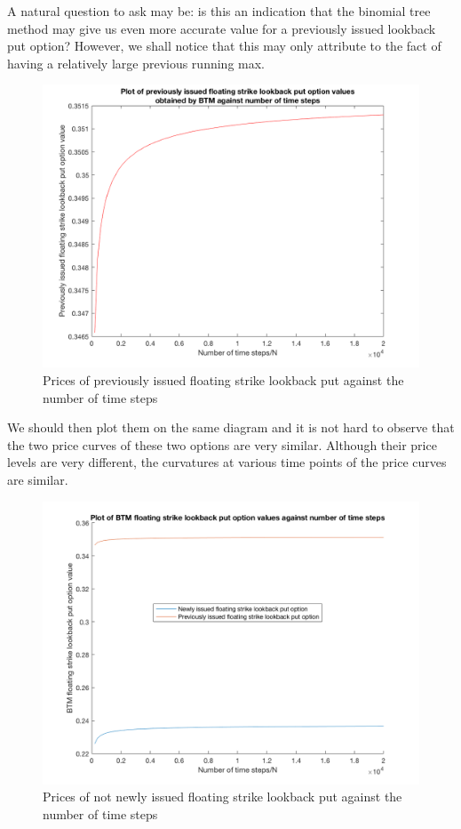 A natural question to ask may be: is this an indication that the binomial tree method may give us even more accurate value for a previously issued lookback put option? However, we shall notice that this may only attribute to the fact of having a relatively large previous running max.\\[4mm]
\begin{figure}[h]
	\centering
	\includegraphics[scale=0.3]{A2_pi.PNG}
	\caption{Prices of previously issued floating strike lookback put against the number of time steps}
\end{figure}
We should then plot them on the same diagram and it is not hard to observe that the two price curves of these two options are very similar. Although their price levels are very different, the curvatures at various time points of the price curves are similar.
\begin{figure}[h]
	\centering
	\includegraphics[scale=0.3]{A2.PNG}
	\caption{Prices of not newly issued floating strike lookback put against the number of time steps}
\end{figure}


